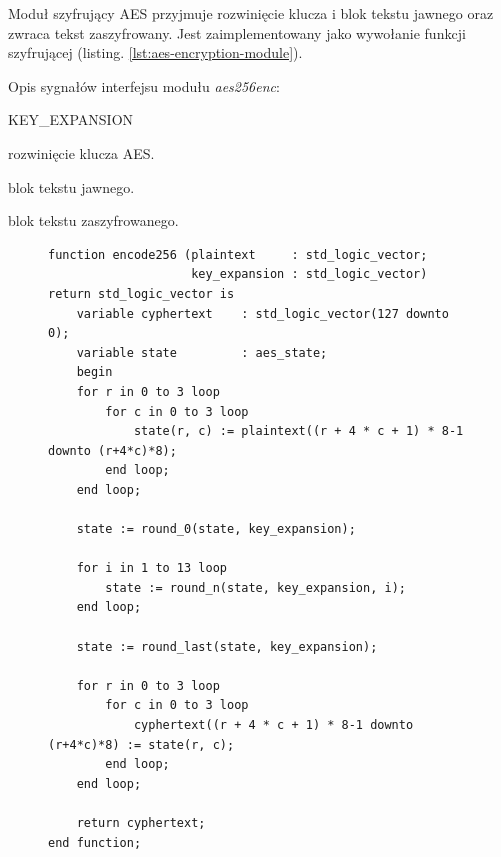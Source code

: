 Moduł szyfrujący AES przyjmuje rozwinięcie klucza i blok tekstu jawnego oraz zwraca tekst zaszyfrowany. Jest zaimplementowany jako wywołanie funkcji szyfrującej (listing. \ref{lst:aes-encryption-module}).

Opis sygnałów interfejsu modułu \textit{aes256enc}:
\begin{interface}{KEY\_EXPANSION}
	\item[\insignal{KEY\_EXPANSION}] rozwinięcie klucza AES.
	\item[\insignal{PLAINTEXT}] blok tekstu jawnego.
	\item[\outsignal{CYPHERTEXT}] blok tekstu zaszyfrowanego.
\end{interface}

\begin{figure}[!h]
\begin{lstlisting}[style=vhdl, captionpos=b, caption={Implementacja funkcji szyfrującej AES}, label={lst:aes-encryption}]
function encode256 (plaintext     : std_logic_vector; 
                    key_expansion : std_logic_vector) 
return std_logic_vector is
	variable cyphertext    : std_logic_vector(127 downto 0);
	variable state         : aes_state;
	begin
	for r in 0 to 3 loop
		for c in 0 to 3 loop
			state(r, c) := plaintext((r + 4 * c + 1) * 8-1 downto (r+4*c)*8);
		end loop;
	end loop;

	state := round_0(state, key_expansion);

	for i in 1 to 13 loop
		state := round_n(state, key_expansion, i);
	end loop;

	state := round_last(state, key_expansion);

	for r in 0 to 3 loop
		for c in 0 to 3 loop
			cyphertext((r + 4 * c + 1) * 8-1 downto (r+4*c)*8) := state(r, c);
		end loop;
	end loop;

	return cyphertext;
end function;
\end{lstlisting}
\end{figure}

